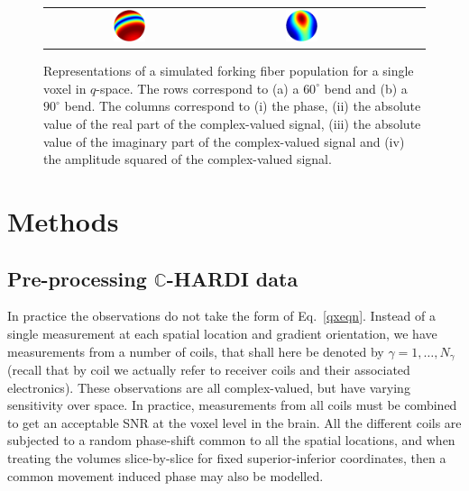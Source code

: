 \documentclass[authoryear,preprint,12pt]{elsarticle}
\newcommand{\bbC}{\mathbb{C}}
\begin{document}
\begin{figure}[tbp]
\begin{center}
\begin{tabular}{c|cccc}
      \includegraphics[width=0.2\textwidth]{try290ny.ps} & 
      \includegraphics[width=0.2\textwidth]{try390ny.ps}
    \end{tabular}
  \end{center}
  \caption{Representations of a simulated forking fiber population for
    a single voxel in $q$-space.  The rows correspond to (a) a
    $60^{\circ}$ bend and (b) a $90^{\circ}$ bend.  The columns
    correspond to (i) the phase, (ii) the absolute value of the real
    part of the complex-valued signal, (iii) the absolute value of the
    imaginary part of the complex-valued signal and (iv) the amplitude
    squared of the complex-valued signal.}
  \label{forking}
\end{figure}

\section{Methods}

\subsection{Pre-processing $\bbC$-HARDI data}
\label{preprocessing}

In practice the observations do not take the form of
Eq.~\eqref{qxeqn}.  Instead of a single measurement at each spatial
location and gradient orientation, we have measurements from a number
of coils, that shall here be denoted by $\gamma=1,\dots,N_{\gamma}$
(recall that by coil we actually refer to receiver coils and their
associated electronics).  These observations are all complex-valued,
but have varying sensitivity over space.  In practice, measurements
from all coils must be combined to get an acceptable SNR at the voxel
level in the brain.  All the different coils are subjected to a random
phase-shift common to all the spatial locations, and when treating the
volumes slice-by-slice for fixed superior-inferior coordinates, then a
common movement induced phase may also be modelled.
\end{document}

